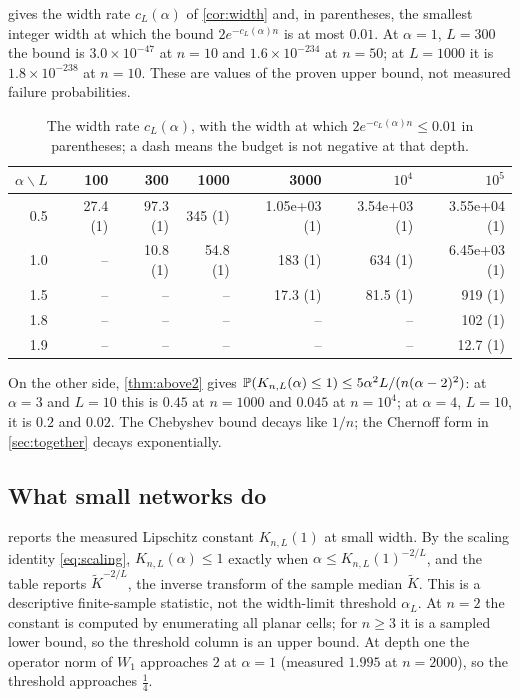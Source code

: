  gives the width rate $c_L(\alpha)$ of \cref{cor:width} and, in parentheses, the smallest integer width at which the bound $2e^{-c_L(\alpha)n}$ is at most $0.01$. At $\alpha=1$, $L=300$ the bound is $3.0\times10^{-47}$ at $n=10$ and $1.6\times10^{-234}$ at $n=50$; at $L=1000$ it is $1.8\times10^{-238}$ at $n=10$. These are values of the proven upper bound, not measured failure probabilities.

\begin{table}[h]\centering
\begin{tabular}{rrrrrrr}
\toprule
$\alpha\backslash L$ & 100 & 300 & 1000 & 3000 & $10^4$ & $10^5$\\
\midrule
0.5 & 27.4 (1) & 97.3 (1) & 345 (1) & 1.05e+03 (1) & 3.54e+03 (1) & 3.55e+04 (1)\\
1.0 & -- & 10.8 (1) & 54.8 (1) & 183 (1) & 634 (1) & 6.45e+03 (1)\\
1.5 & -- & -- & -- & 17.3 (1) & 81.5 (1) & 919 (1)\\
1.8 & -- & -- & -- & -- & -- & 102 (1)\\
1.9 & -- & -- & -- & -- & -- & 12.7 (1)\\
\bottomrule
\end{tabular}
\caption{The width rate $c_L(\alpha)$, with the width at which $2e^{-c_L(\alpha)n}\le0.01$ in parentheses; a dash means the budget is not negative at that depth.}
\label{tab:rate}
\end{table}

On the other side, \cref{thm:above2} gives $\mathbb{P}(K_{n,L}(\alpha)\le1)\le5\alpha^2L/(n(\alpha-2)^2)$: at $\alpha=3$ and $L=10$ this is $0.45$ at $n=1000$ and $0.045$ at $n=10^4$; at $\alpha=4$, $L=10$, it is $0.2$ and $0.02$. The Chebyshev bound decays like $1/n$; the Chernoff form in \cref{sec:together} decays exponentially.

\subsection{What small networks do}

 reports the measured Lipschitz constant $K_{n,L}(1)$ at small width. By the scaling identity \cref{eq:scaling}, $K_{n,L}(\alpha)\le1$ exactly when $\alpha\le K_{n,L}(1)^{-2/L}$, and the table reports $\widetilde K^{-2/L}$, the inverse transform of the sample median $\widetilde K$. This is a descriptive finite-sample statistic, not the width-limit threshold $\alpha_L$. At $n=2$ the constant is computed by enumerating all planar cells; for $n\ge3$ it is a sampled lower bound, so the threshold column is an upper bound. At depth one the operator norm of $W_1$ approaches $2$ at $\alpha=1$ (measured $1.995$ at $n=2000$), so the threshold approaches $\tfrac14$.


